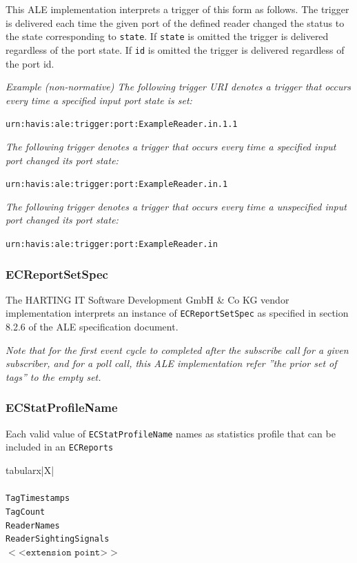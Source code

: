 \documentclass[11pt,a4paper,oneside]{article}
\newenvironment{code}%
   {\snugshade\begin{internallinenumbers}}%
   {\end{internallinenumbers}\endsnugshade}
\newenvironment{code}
    {\HCode{<div class='code'><p>}}
    {\HCode{</p></div>}}
\newenvironment{bbox}%
{\begin{table}[h!]\begin{threeparttable}}%
{\end{threeparttable}\end{table}\FloatBarrier}
\newenvironment{bbox}
{\ifvmode\IgnorePar\fi \EndP\Tg<div class='bbox'>}{\Tg</div>\IgnoreIndent}
\begin{document}
This ALE implementation interprets a trigger of this form as follows. The trigger is delivered each time the given port of the defined reader changed the status to the state corresponding to \texttt{state}. If \texttt{state} is omitted the trigger is delivered regardless of the port state. If \texttt{id} is omitted the trigger is delivered regardless of the port id.

\begin {code}
\emph{Example (non-normative) The following trigger URI denotes a trigger that occurs every time a specified input port state is set:}\

\texttt{urn:havis:ale:trigger:port:ExampleReader.in.1.1}\

\emph{The following trigger denotes a trigger that occurs every time a specified input port changed its port state:}

\texttt{urn:havis:ale:trigger:port:ExampleReader.in.1}

\emph{The following trigger denotes a trigger that occurs every time a unspecified input port changed its port state:}

\texttt{urn:havis:ale:trigger:port:ExampleReader.in}
\end{code}

\subsubsection{ECReportSetSpec}
The HARTING IT Software Development GmbH \& Co KG vendor implementation interprets an instance of  \texttt{ECReportSetSpec} as specified in section 8.2.6 of the ALE specification document.

\begin {code}
\emph{Note that for the first event cycle to completed after the subscribe call for a given subscriber, and for a poll call, this ALE implementation refer ''the prior set of tags'' to the empty set.}
\end{code}

\subsubsection{ECStatProfileName}
Each valid value of \texttt{ECStatProfileName} names as statistics profile that can be included in an \texttt{ECReports}

\begin{bbox}
\begin{edtable}{tabularx}{\linewidth}{|X|}
\hline 
{}
\\
\\
\texttt{TagTimestamps}\\
\texttt{TagCount}\\
\texttt{ReaderNames}\\
\texttt{ReaderSightingSignals}\\
$<$<$\texttt{extension point}$>$>$\\
\hline
\end{edtable}
\end{bbox}
\end{document}
